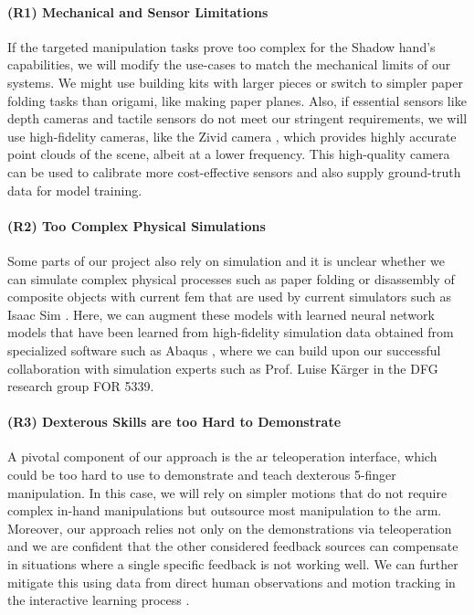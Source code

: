 \documentclass{erc-B2}
\begin{document}
\paragraph{(R1) Mechanical and Sensor Limitations} If the targeted manipulation tasks prove too complex for the Shadow hand's capabilities, we will modify the use-cases to match the mechanical limits of our systems. We might use building kits with larger pieces or switch to simpler paper folding tasks than origami, like making paper planes.
Also, if essential sensors like depth cameras and tactile sensors do not meet our stringent requirements, we will use high-fidelity cameras, like the Zivid camera \cite{zivid}, which provides highly accurate point clouds of the scene, albeit at a lower frequency. This high-quality camera can be used to calibrate more cost-effective sensors and also supply ground-truth data for model training.
\paragraph{(R2) Too Complex Physical Simulations}
Some parts of our project also rely on simulation and it is unclear whether we can simulate complex physical processes such as paper folding or disassembly of composite objects with current \gls*{fem} that are used by current simulators such as Isaac Sim \cite{mittal2023orbit}. Here, we can augment these models with learned neural network models that have been learned from high-fidelity simulation data obtained from specialized software such as Abaqus \cite{abaqus}, where we can build upon our successful collaboration with simulation experts such as Prof. Luise Kärger in the DFG research group FOR 5339.

\paragraph{(R3) Dexterous Skills are too Hard to Demonstrate}
A pivotal component of our approach is the \gls*{ar} teleoperation interface, which could be too hard to use to demonstrate and teach dexterous 5-finger manipulation. In this case, we will rely on simpler motions that do not require complex in-hand manipulations but outsource most manipulation to the arm. 
Moreover, our approach relies not only on the demonstrations via teleoperation and we are confident that the other considered feedback sources can compensate in situations where a single specific feedback is not working well. 
We can further mitigate this using data from direct human observations and motion tracking in the interactive learning process \cite{Jianfeng2023KVIL}.
\end{document}
